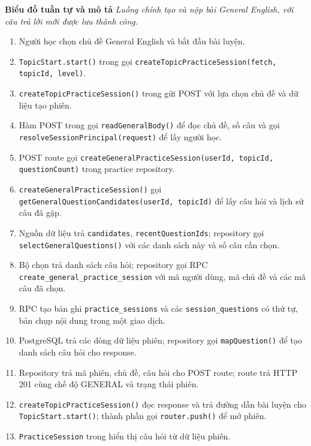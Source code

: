 \documentclass[12pt,a4paper,oneside]{report}
\begin{document}
\noindent\textbf{Biểu đồ tuần tự và mô tả}
\noindent\textit{Luồng chính tạo và nộp bài General English, với câu trả lời mới được lưu thành công.}
\begin{enumerate}
    \item Người học chọn chủ đề General English và bắt đầu bài luyện.
    \item \texttt{TopicStart.start()} trong  gọi \texttt{createTopicPracticeSession(fetch, topicId, level)}.
    \item \texttt{createTopicPracticeSession()} trong  gửi POST  với lựa chọn chủ đề và dữ liệu tạo phiên.
    \item Hàm POST trong  gọi \texttt{readGeneralBody()} để đọc chủ đề, số câu và gọi \texttt{resolveSessionPrincipal(request)} để lấy người học.
    \item POST route gọi \texttt{createGeneralPracticeSession(userId, topicId, questionCount)} trong practice repository.
    \item \texttt{createGeneralPracticeSession()} gọi \texttt{getGeneralQuestionCandidates(userId, topicId)} để lấy câu hỏi và lịch sử câu đã gặp.
    \item Nguồn dữ liệu trả \texttt{candidates}, \texttt{recentQuestionIds}; repository gọi \texttt{selectGeneralQuestions()} với các danh sách này và số câu cần chọn.
    \item Bộ chọn trả danh sách câu hỏi; repository gọi RPC \texttt{create\_general\_practice\_session} với mã người dùng, mã chủ đề và các mã câu đã chọn.
    \item RPC tạo bản ghi \texttt{practice\_sessions} và các \texttt{session\_questions} có thứ tự, bản chụp nội dung trong một giao dịch.
    \item PostgreSQL trả các dòng dữ liệu phiên; repository gọi \texttt{mapQuestion()} để tạo danh sách câu hỏi cho response.
    \item Repository trả mã phiên, chủ đề, câu hỏi cho POST route; route trả HTTP 201 cùng chế độ GENERAL và trạng thái phiên.
    \item \texttt{createTopicPracticeSession()} đọc response và trả đường dẫn bài luyện cho \texttt{TopicStart.start()}; thành phần gọi \texttt{router.push()} để mở phiên.
    \item \texttt{PracticeSession} trong  hiển thị câu hỏi từ dữ liệu phiên.

\end{enumerate}
\end{document}
